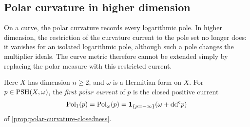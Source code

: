 \subsection{Polar curvature in higher dimension}
\label{subsec:polar-first-current-obstruction}

On a curve, the polar curvature records every logarithmic pole. In higher dimension, the restriction of the curvature current to the pole set no longer does: it vanishes for an isolated logarithmic pole, although such a pole changes the multiplier ideals. The curve metric therefore cannot be extended simply by replacing the polar measure with this restricted current.

Here $X$ has dimension $n\geq2$, and $\omega$ is a Hermitian form on $X$. For $p\in\mathrm{PSH}(X,\omega)$, the \emph{first polar current} of $p$ is the closed positive current
\[
 \operatorname{Pol}_1(p)=\operatorname{Pol}_\omega(p)
      =\mathbf1_{\{p=-\infty\}}(\omega+\mathrm{dd}^{\mathrm{c}} p)
\]
of \cref{prop:polar-curvature-closedness}.


